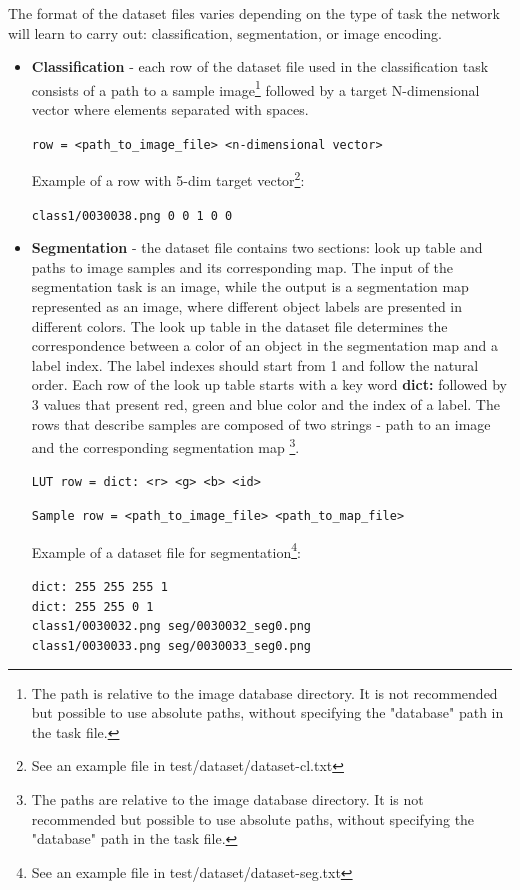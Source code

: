 \documentclass[a4paper, 11pt]{article}
\begin{document}
The format of the dataset files varies depending on the type of task the network will learn to carry out: classification, segmentation, or image encoding. 

\begin{itemize}
\item \textbf{Classification} - each row of the dataset file used in the classification task consists of a path to a sample image\footnote{The path is relative to the image database directory. It is not recommended but possible to use absolute paths, without specifying the "database" path in the task file.} followed by a target N-dimensional vector where elements separated with spaces.

\texttt{row = <path\_to\_image\_file> <n-dimensional vector>}

Example of a row with 5-dim target vector\footnote{See an example file in test/dataset/dataset-cl.txt}: 

\texttt{class1/0030038.png 0 0 1 0 0}

\item \textbf{Segmentation} - the dataset file contains two sections: look up table and paths to image samples and its corresponding map.
The input of the segmentation task is an image, while the output is a segmentation map represented as an image, where different object labels are presented in different colors. The look up table in the dataset file determines the correspondence between a color of an object in the segmentation map and a label index. The label indexes should start from 1 and follow the natural order. Each row of the look up table starts with a key word \textbf{dict:} followed by 3 values that present red, green and blue color and the index of a label. The rows that describe samples are composed of two strings - path to an image and the corresponding segmentation map \footnote{The paths are relative to the image database directory. It is not recommended but possible to use absolute paths, without specifying the "database" path in the task file.}.

\texttt{LUT row = dict: <r> <g> <b> <id>}

\texttt{Sample row = <path\_to\_image\_file> <path\_to\_map\_file>}

Example of a dataset file for segmentation\footnote{See an example file in test/dataset/dataset-seg.txt}:

\texttt{dict: 255 255 255 1}\\
\texttt{dict: 255 255 0 1}\\
\texttt{class1/0030032.png seg/0030032\_seg0.png}\\
\texttt{class1/0030033.png seg/0030033\_seg0.png}\\


\end{itemize}
\end{document}
